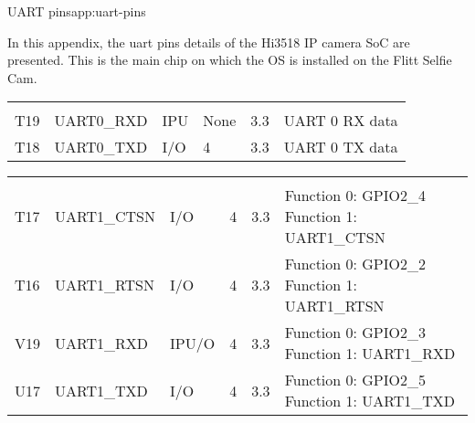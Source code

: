 \begin{appchaptercover}{UART pins}{app:uart-pins}

In this appendix, the \acrshort{uart} pins details of the Hi3518 IP camera SoC are presented. This is the main chip on which the OS is installed on the Flitt Selfie Cam.

\begingroup
\renewcommand*{\arraystretch}{1.3}

\begin{center}
  \begin{tabular}{C{1.5cm}C{3cm}C{1.2cm}C{2.5cm}C{1.5cm}L{6cm}}
   &  &  &  &  &  \\
  T19 & UART0\_RXD & IPU & None & 3.3 & UART 0 RX data \\
  T18 & UART0\_TXD & I/O & 4    & 3.3 & UART 0 TX data \\
  \end{tabular}
\end{center}

\begin{center}
  \begin{tabular}{C{1.5cm}C{3cm}C{1.2cm}C{2.5cm}C{1.5cm}L{6cm}}
   &  &  &  &  &  \\
  T17 & UART1\_CTSN & I/O & 4 & 3.3 & Function 0: GPIO2\_4 \newline Function 1: UART1\_CTSN \\
  T16 & UART1\_RTSN & I/O & 4 & 3.3 & Function 0: GPIO2\_2 \newline Function 1: UART1\_RTSN \\
  V19 & UART1\_RXD & IPU/O & 4 & 3.3 & Function 0: GPIO2\_3 \newline Function 1: UART1\_RXD \\
  U17 & UART1\_TXD & I/O & 4 & 3.3 & Function 0: GPIO2\_5 \newline Function 1: UART1\_TXD \\
  \end{tabular}
\end{center}


\end{appchaptercover}

